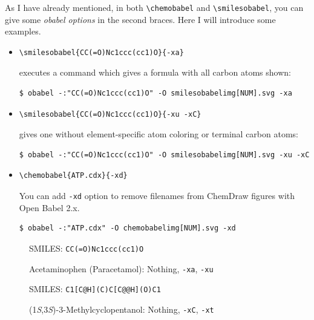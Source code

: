 \documentclass[12pt]{ltjsarticle}
\begin{document}
As I have already mentioned, in both \verb|\chemobabel| and \verb|\smilesobabel|,
you can give some \textit{obabel options} in the second braces.
Here I will introduce some examples.
\begin{itemize}
\item
\begin{verbatim}
\smilesobabel{CC(=O)Nc1ccc(cc1)O}{-xa}
\end{verbatim}
executes a command which gives a formula with all carbon atoms shown:
\begin{verbatim}
$ obabel -:"CC(=O)Nc1ccc(cc1)O" -O smilesobabelimg[NUM].svg -xa
\end{verbatim}
\item
\begin{verbatim}
\smilesobabel{CC(=O)Nc1ccc(cc1)O}{-xu -xC}
\end{verbatim}
gives one without element-specific atom coloring or terminal carbon atoms:
\begin{verbatim}
$ obabel -:"CC(=O)Nc1ccc(cc1)O" -O smilesobabelimg[NUM].svg -xu -xC
\end{verbatim}
\item
\begin{verbatim}
\chemobabel{ATP.cdx}{-xd}
\end{verbatim}
You can add \texttt{-xd} option to remove filenames from ChemDraw figures with Open Babel 2.x.
\begin{verbatim}
$ obabel -:"ATP.cdx" -O chemobabelimg[NUM].svg -xd
\end{verbatim}
\end{itemize}

\begin{figure}[ht]
  \centering
   \hspace{1cm}
   \hspace{1cm}
  \caption{Acetaminophen (Paracetamol): Nothing, \texttt{-xa}, \texttt{-xu}}
  SMILES: \verb|CC(=O)Nc1ccc(cc1)O|
\end{figure}

\begin{figure}[ht]
  \centering
   \hspace{1cm}
   \hspace{1cm}
  \caption{(1\textit{S},3\textit{S})-3-Methylcyclopentanol: Nothing, \texttt{-xC}, \texttt{-xt}}
  SMILES: \verb|C1[C@H](C)C[C@@H](O)C1|
\end{figure}
\end{document}
